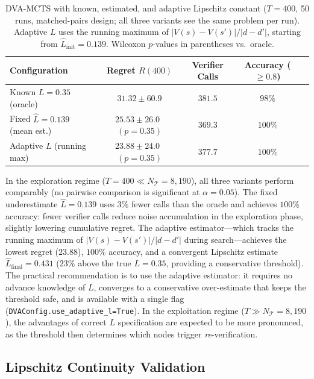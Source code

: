 \begin{table}[t]
\centering
\caption{DVA-MCTS with known, estimated, and adaptive Lipschitz constant ($T{=}400$,
  50 runs, matched-pairs design; all three variants see the same problem per run).
  Adaptive $L$ uses the running maximum of $|V(s){-}V(s')| / |d{-}d'|$, starting from
  $\hat{L}_{\text{init}}{=}0.139$.  Wilcoxon $p$-values in parentheses vs.\ oracle.}
\label{tab:lhat}
\begin{tabular}{lcccc}
\toprule
Configuration & Regret $R(400)$ & Verifier Calls & Accuracy ($\geq 0.8$) \\
\midrule
Known $L{=}0.35$ (oracle)            & $31.32 \pm 60.9$ & $381.5$ & $98\%$  \\
Fixed $\hat{L}{=}0.139$ (mean est.)  & $25.53 \pm 26.0$~$(p{=}0.35)$ & $369.3$ & $100\%$  \\
Adaptive $L$ (running max)           & $\mathbf{23.88} \pm 24.0$~$(p{=}0.35)$ & $377.7$ & $100\%$ \\
\bottomrule
\end{tabular}
\end{table}

In the exploration regime ($T{=}400 \ll N_{\mathcal{T}}{=}8{,}190$), all three
variants perform comparably (no pairwise comparison is significant at $\alpha{=}0.05$).
The fixed underestimate $\hat{L}{=}0.139$ uses $3\%$ fewer calls than the oracle
and achieves $100\%$ accuracy: fewer verifier calls reduce noise accumulation in the
exploration phase, slightly lowering cumulative regret.
The adaptive estimator---which tracks the running maximum of
$|V(s){-}V(s')| / |d{-}d'|$ during search---achieves the lowest regret ($23.88$),
$100\%$ accuracy, and a convergent Lipschitz estimate $\hat{L}_{\text{final}}{=}0.431$
($23\%$ above the true $L{=}0.35$, providing a conservative threshold).
The practical recommendation is to use the adaptive estimator: it requires no advance
knowledge of $L$, converges to a conservative over-estimate that keeps the
threshold safe, and is available with a single flag
(\texttt{DVAConfig.use\_adaptive\_l=True}).  In the exploitation regime ($T \gg N_{\mathcal{T}} = 8{,}190$),
the advantages of correct $L$ specification are expected to be more pronounced, as the
threshold then determines which nodes trigger \emph{re}-verification.

\subsection{Lipschitz Continuity Validation}
\label{sec:lipschitz_results}


